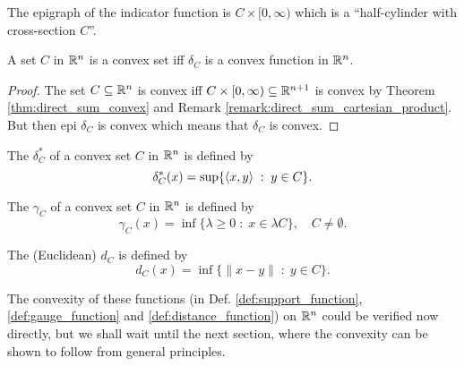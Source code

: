 \documentclass[11pt,a4paper]{article}
\begin{document}
\begin{remark}
    The epigraph of the indicator function is $C\times [0,\infty)$ which is a ``half-cylinder with cross-section $C$''. 
\end{remark}

\begin{proposition}
    A set $C$ in $\mathbb{R}^n$ is a convex set iff $\delta_C$ is a convex function in $\mathbb{R}^n$. 
\end{proposition}

\begin{proof}
    The set $C\subseteq\mathbb{R}^n$ is convex iff $C\times [0,\infty)\subseteq\mathbb{R}^{n+1}$ is convex by Theorem \ref{thm:direct_sum_convex} and Remark \ref{remark:direct_sum_cartesian_product}. But then epi $\delta_C$ is convex which means that $\delta_C$ is convex.
\end{proof}

\begin{definition}\label{def:support_function}
    The  $\delta_C^*$ of a convex set $C$ in $\mathbb{R}^n$ is defined by
    \begin{equation*}
        \delta_C^*(x) = \sup\{\langle x, y \rangle\;:\;y\in C\}.
    \end{equation*}
\end{definition}

\begin{definition}\label{def:gauge_function}
    The  $\gamma_C$ of a convex set $C$ in $\mathbb{R}^n$ is defined by 
    \begin{equation*}
        \gamma_C(x) = \inf\{\lambda\ge 0\;:\; x\in \lambda C\},\quad C\neq \emptyset.
    \end{equation*}
\end{definition}

\begin{definition}\label{def:distance_function}
    The (Euclidean)  $d_C$ is defined by
    \begin{equation*}
        d_C(x) = \inf\{\|x-y\|\;:\;y\in C\}.
    \end{equation*}
\end{definition}

\begin{remark}
    The convexity of these functions (in Def. \ref{def:support_function}, \ref{def:gauge_function} and \ref{def:distance_function}) on $\mathbb{R}^n$ could be verified now directly, but we shall wait until the next section, where the convexity can be shown to follow from general principles.
\end{remark}
\end{document}
